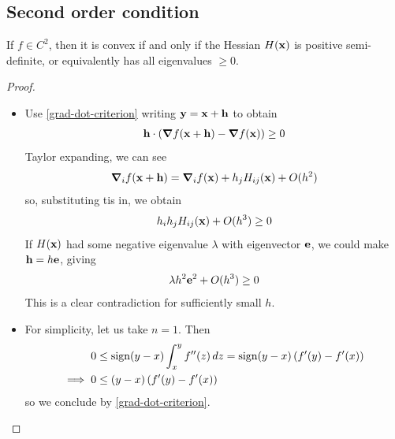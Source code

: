 \documentclass{../../template/note}
\begin{document}
    \subsection{Second order condition}

    \begin{theorem}
        \label{second-order-condition}
        If $f \in C^2$, then it is convex if and only if the Hessian $H(\V x)$ is positive semi-definite, or equivalently has all eigenvalues $\geq 0$.
    \end{theorem}
    
    \begin{proof}
        \begin{itemize}
            \item[$\implies$] Use \cref{grad-dot-criterion} writing $\V y = \V x + \V h$ to obtain
            \begin{align*}
                \V h \cdot \left(\grad f(\V x + \V h) - \grad f(\V x)\right) \geq 0
            \end{align*}
            Taylor expanding, we can see
            \begin{align*}
                \grad_i f(\V x + \V h) = \grad_i f(\V x) + h_j H_{ij} (\V x) + O(h^2)
            \end{align*}
            so, substituting tis in, we obtain
            \begin{align*}
                h_i h_j H_{ij}(\V x) + O(h^3) \geq 0
            \end{align*}
            If $H(\V x)$ had some negative eigenvalue $\lambda$ with eigenvector $\V e$, we could make $\V h = h \V e$, giving
            \begin{align*}
                \lambda h^2 \V e^2 + O(h^3) \geq 0
            \end{align*}
            This is a clear contradiction for sufficiently small $h$.
            \item[$\impliedby$] For simplicity, let us take $n=1$. Then
            \begin{align*}
                0 &\leq \operatorname{sign}(y-x) \int_x^y f''(z) \,d{z} = \operatorname{sign}(y-x) \left(f'(y)-f'(x)\right) \\
                \implies 0 &\leq (y-x) \left(f'(y)-f'(x)\right)
            \end{align*}
            so we conclude by \cref{grad-dot-criterion}.            
        \end{itemize}
    \end{proof}
    
\end{document}
